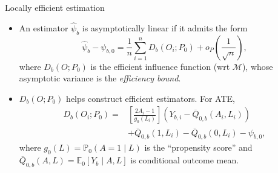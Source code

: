 \documentclass{beamer}
\begin{document}
\begin{frame}[c]{Locally efficient estimation}

\begin{center}
\begin{itemize}
  \itemsep6pt
  \item An estimator $\hat{\psi}_b$ is asymptotically linear if it admits the
    form
    $$ \hat{\psi}_b - \psi_{b,0} = \frac{1}{n} \sum_{i = 1}^{n}
      D_b(O_i; P_0) + o_P\left(\frac{1}{\sqrt{n}}\right), $$
      where $D_b(O; P_0)$ is the efficient influence function (wrt
      $\mathcal{M}$), whose asymptotic variance is the \textit{efficiency
      bound}.
  \item $D_b(O; P_0)$ helps construct efficient estimators. For ATE,
    \begin{align*}
      D_b (O_i; P_0) =& \left[\frac{2A_i - 1}{g_0(L_i)} \right] (Y_{b, i} -
      \overline{Q}_{0,b}(A_i, L_i))\\ &+ \overline{Q}_{0,b}(1, L_i)
      - \overline{Q}_{0,b}(0, L_i) - \psi_{b, 0},
    \end{align*}
    where $g_0(L) = \mathbb{P}_0(A = 1 \mid L)$ is the ``propensity score''
    and $\overline{Q}_{0,b}(A,L) = \mathbb{E}_0[Y_b \mid A, L]$ is conditional
    outcome mean.
\end{itemize}
\end{center}

\end{frame}

\end{document}
